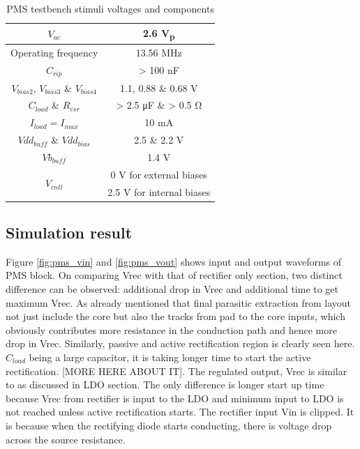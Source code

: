 \documentclass[UKenglish]{ifimaster}  %
\begin{document}
\begin{table}[!htbp]
\caption{PMS testbench stimuli voltages and components} 
\begin{center}
\begin{tabular}{c|c}
\hline \hline
$V_{ac} $			& 2.6 \si{\volt}\textsubscript{p} \\ \hline
Operating frequency	& 13.56 \si{\mega\hertz}	\\ \hline
$C_{rip}$ 		  	& > 100 \si{\nano\farad}	\\ \hline
$V_{bias2}$, $V_{bias3}$ \& $V_{bias4}$ & 1.1, 0.88 \& 0.68 \si{\volt} \\ \hline
$C_{load}$ \& $R_{esr}$ & > 2.5 \si{\micro\farad} \& > 0.5 \si{\ohm} \\ \hline
$I_{load} = I_{max}$ & 10 \si{\milli\ampere} \\ \hline
$Vdd_{buff}$ \& $Vdd_{bias}$ & 2.5 \& 2.2 \si{\volt} \\ \hline
$Vb_{buff}$ & 1.4 V \\ \hline
\multirow{2}{*}{$V_{cntl}$} 
			& 0 \si{\volt} for external biases \\ \cline{2-2}
			& 2.5 \si{\volt} for internal biases  \\ 
\hline \hline
\end{tabular}
\end{center}
\label{tab:pms_stimuli}
\end{table}%


\subsection{Simulation result} %

Figure \ref{fig:pms_vin} and \ref{fig:pms_vout} shows input and output waveforms of PMS block. On comparing Vrec with 
that of rectifier only section, two distinct difference can be observed: additional drop in Vrec and additional time to 
get maximum Vrec. As already mentioned that final parasitic extraction from layout not just include the core but also 
the tracks from pad to the core inputs, which obviously contributes more resistance in the conduction path and hence 
more drop in Vrec. Similarly, passive and active rectification region is clearly seen here. $C_{load}$ being a large 
capacitor, it is taking longer time to start the active rectification. [MORE HERE ABOUT IT]. 
The regulated output, Vrec is similar to as discussed in LDO section. The only difference is longer start up time because 
Vrec from rectifier is input to the LDO and minimum input to LDO is not reached unless active rectification starts. The 
rectifier input Vin is clipped. It is because when the rectifying diode starts conducting, there is voltage drop across 
the source resistance. \\
\end{document}
